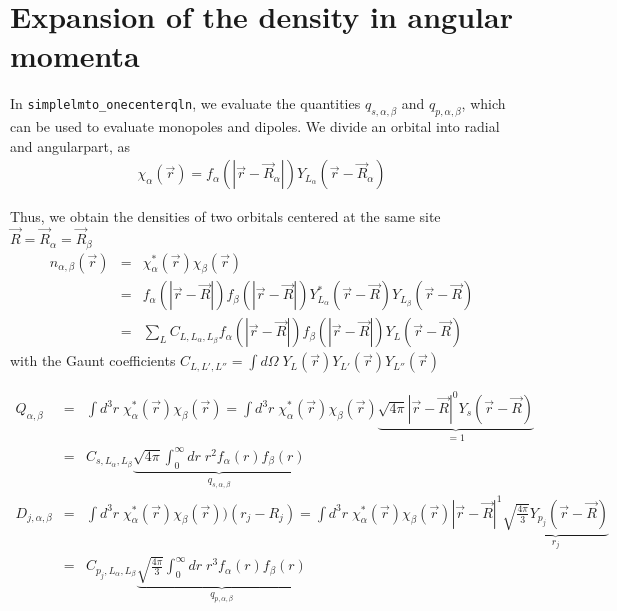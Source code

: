 \documentclass[11pt,a4paper]{report}
\begin{document}
\section{Expansion of the density in angular momenta}
In
\verb|simplelmto_onecenterqln|, we evaluate the quantities
$q_{s,\alpha,\beta}$ and $q_{p,\alpha,\beta}$, which can be used to
evaluate monopoles and dipoles. We divide an orbital into radial and
angularpart, as
\begin{eqnarray}
\chi_\alpha(\vec{r})=f_{\alpha}(|\vec{r}-\vec{R}_\alpha|)
Y_{L_\alpha}(\vec{r}-\vec{R}_\alpha)
\end{eqnarray}

Thus, we obtain the densities of two orbitals centered at the same
site $\vec{R}=\vec{R}_\alpha=\vec{R}_\beta$
\begin{eqnarray}
n_{\alpha,\beta}(\vec{r})&=&\chi^*_\alpha(\vec{r})\chi_\beta(\vec{r})
\nonumber\\
&=&
f_{\alpha}(|\vec{r}-\vec{R}|)f_{\beta}(|\vec{r}-\vec{R}|)
Y^*_{L_\alpha}(\vec{r}-\vec{R})Y_{L_\beta}(\vec{r}-\vec{R})
\nonumber\\
&=&\sum_L  C_{L,L_\alpha,L_\beta}
f_{\alpha}(|\vec{r}-\vec{R}|)f_{\beta}(|\vec{r}-\vec{R}|)
Y_L(\vec{r}-\vec{R})
\end{eqnarray}
with the Gaunt coefficients $C_{L,L',L''}=\int d\Omega\; Y_L(\vec{r})
Y_{L'}(\vec{r})Y_{L''}(\vec{r})$



\begin{eqnarray}
Q_{\alpha,\beta}&=&
\int d^3r\; \chi^*_\alpha(\vec{r})\chi_\beta(\vec{r})
=
\int d^3r\; \chi^*_\alpha(\vec{r})\chi_\beta(\vec{r})
\underbrace{\sqrt{4\pi}|\vec{r}-\vec{R}|^0 Y_s(\vec{r}-\vec{R})}_{=1}
\nonumber\\
&=&C_{s,L_\alpha,L_\beta}
\underbrace{
\sqrt{4\pi}\int_0^\infty dr\; r^{2} f_{\alpha}(r)f_{\beta}(r)
}_{q_{s,\alpha,\beta}}
\label{eq:monopoleslater}
\\
%
%
D_{j,\alpha,\beta}&=&
\int d^3r\; \chi^*_\alpha(\vec{r})\chi_\beta(\vec{r}))(r_j-R_j)
=
\int d^3r\; \chi^*_\alpha(\vec{r})\chi_\beta(\vec{r})|\vec{r}-\vec{R}|^1 
\underbrace{\sqrt{\frac{4\pi}{3}}Y_{p_j}(\vec{r}-\vec{R})}_{r_j}
\nonumber\\
&=&
C_{p_j,L_\alpha,L_\beta}
\underbrace{
\sqrt{\frac{4\pi}{3}}\int_0^\infty dr\; r^3f_{\alpha}(r)f_{\beta}(r) 
}_{q_{p,\alpha,\beta}}
\label{eq:dipoleslater}
\end{eqnarray}
\end{document}
